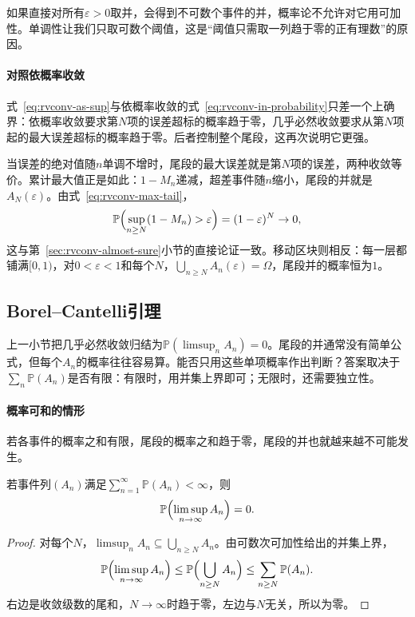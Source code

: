 如果直接对所有$\varepsilon>0$取并，会得到不可数个事件的并，概率论不允许对它用可加性。单调性让我们只取可数个阈值，这是“阈值只需取一列趋于零的正有理数”的原因。

\paragraph{对照依概率收敛}
式~\eqref{eq:rvconv-as-sup}与依概率收敛的式~\eqref{eq:rvconv-in-probability}只差一个上确界：依概率收敛要求第$N$项的误差超标的概率趋于零，几乎必然收敛要求从第$N$项起的最大误差超标的概率趋于零。后者控制整个尾段，这再次说明它更强。

当误差的绝对值随$n$单调不增时，尾段的最大误差就是第$N$项的误差，两种收敛等价。累计最大值正是如此：$1-M_n$递减，超差事件随$n$缩小，尾段的并就是$A_N(\varepsilon)$。由式~\eqref{eq:rvconv-max-tail}，
\[
 \mathbb{P}\Bigl(\sup_{n\geq N}(1-M_n)>\varepsilon\Bigr)=(1-\varepsilon)^{N}\to0 ,
\]
这与第~\ref{sec:rvconv-almost-sure}小节的直接论证一致。移动区块则相反：每一层都铺满$[0,1)$，对$0<\varepsilon<1$和每个$N$，$\bigcup_{n\geq N}A_n(\varepsilon)=\Omega$，尾段并的概率恒为$1$。

\subsection{Borel–Cantelli引理}
\label{sec:rvconv-borel-cantelli}

上一小节把几乎必然收敛归结为$\mathbb{P}(\limsup_nA_n)=0$。尾段的并通常没有简单公式，但每个$A_n$的概率往往容易算。能否只用这些单项概率作出判断？答案取决于$\sum_n\mathbb{P}(A_n)$是否有限：有限时，用并集上界即可；无限时，还需要独立性。

\paragraph{概率可和的情形}
若各事件的概率之和有限，尾段的概率之和趋于零，尾段的并也就越来越不可能发生。

\begin{lemma}
\label{lem:rvconv-borel-cantelli}
若事件列$(A_n)$满足$\sum_{n=1}^{\infty}\mathbb{P}(A_n)<\infty$，则
\begin{equation}
 \mathbb{P}\Bigl(\limsup_{n\to\infty}A_n\Bigr)=0 .
 \label{eq:rvconv-bc1}
\end{equation}
\end{lemma}

\begin{proof}
对每个$N$，$\limsup_nA_n\subseteq\bigcup_{n\geq N}A_n$。由可数次可加性给出的并集上界，
\[
 \mathbb{P}\Bigl(\limsup_{n\to\infty}A_n\Bigr)\leq\mathbb{P}\Bigl(\bigcup_{n\geq N}A_n\Bigr)\leq\sum_{n\geq N}\mathbb{P}(A_n) .
\]
右边是收敛级数的尾和，$N\to\infty$时趋于零，左边与$N$无关，所以为零。
\end{proof}

